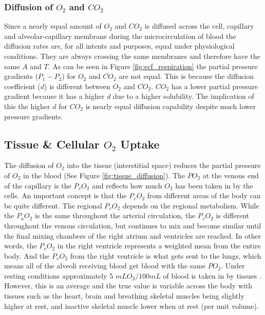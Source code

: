 \subsubsection{Diffusion of $O_2$ and $CO_2$}

Since a nearly equal amount of $O_2$ and $CO_2$ is diffused across the cell, capillary and alveolar-capillary membrane during the microcirculation of blood the diffusion rates are, for all intents and purposes, equal under physiological conditions. They are always crossing the same membranes and therefore have the same $A$ and $T$. As can be seen in Figure \ref{fig:ecf_respiration} the partial pressure gradients ($P_1 - P_2$) for $O_2$ and $CO_2$ are not equal. This is because the diffusion coefficient ($d$) is different between $O_2$ and $CO_2$. $CO_2$ has a lower partial pressure gradient because it has a higher $d$ due to a higher solubility. The implication of this the higher $d$ for $CO_2$ is nearly equal diffusion capability despite much lower pressure gradients.\footnotemark{}

\subsection{Tissue \& Cellular $O_2$ Uptake}

The diffusion of $O_2$ into the tissue (interstitial space) reduces the partial pressure of $O_2$ in the blood (See Figure \ref{fig:tissue_diffusion}). The $PO_2$ at the venous end of the capillary is the $P_vO_2$ and reflects how much $O_2$ has been taken in by the cells. An important concept is that the $P_vO_2$ from different areas of the body can be quite different. The regional $P_vO_2$ depends on the regional metabolism. While the $P_aO_2$ is the same throughout the arterial circulation, the $P_vO_2$ is different throughout the venous circulation, but continues to mix and become similar until the final mixing chambers of the right atrium and ventricles are reached. In other words, the $P_vO_2$ in the right ventricle represents a weighted mean from the entire body. And the $P_vO_2$ from the right ventricle is what gets sent to the lungs, which means all of the alveoli receiving blood get blood with the same $PO_2$. Under resting conditions approximately 5 $mL O_2 / 100 mL$ of blood is taken in by tissues \cite{hall_guyton_2020}. However, this is an average and the true value is variable across the body with tissues such as the heart, brain and breathing skeletal muscles being slightly higher at rest, and inactive skeletal muscle lower when at rest (per unit volume).

